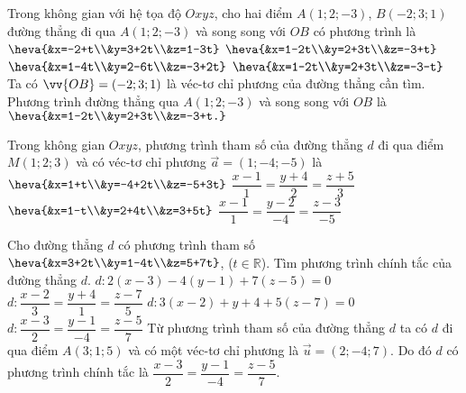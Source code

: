 \begin{ex}%
	Trong không gian với hệ tọa độ $O x y z$, cho hai điểm $A(1;2;-3)$, $B(-2;3;1)$ đường thẳng đi qua $A(1;2;-3)$ và song song với $OB$ có phương trình là 
	\choice 
	{$\heva{&x=-2+t\\&y=3+2t\\&z=1-3t}$}
	{\True $\heva{&x=1-2t\\&y=2+3t\\&z=-3+t}$}
	{$\heva{&x=1-4t\\&y=2-6t\\&z=-3+2t}$}
	{$\heva{&x=1-2t\\&y=2+3t\\&z=-3-t}$}
					\loigiai 
					{
	Ta có $\vv{OB}=(-2;3;1)$ là véc-tơ chỉ phương của đường thẳng cần tìm.\\
	Phương trình đường thẳng qua $A(1;2;-3)$ và song song với $OB$ là $\heva{&x=1-2t\\&y=2+3t\\&z=-3+t.}$
					}
\end{ex}

\begin{ex}%
Trong không gian $O x y z$, phương trình tham số của đường thẳng $d$ đi qua điểm $M(1;2;3)$ và có véc-tơ chỉ phương $\vec{a}=(1;-4;-5)$ là 
\choice 
{$\heva{&x=1+t\\&y=-4+2t\\&z=-5+3t}$}
{$\dfrac{x-1}{1}=\dfrac{y+4}{2}=\dfrac{z+5}{3}$}
{$\heva{&x=1-t\\&y=2+4t\\&z=3+5t}$\True}
{$\dfrac{x-1}{1}=\dfrac{y-2}{-4}=\dfrac{z-3}{-5}$}
\end{ex}

\begin{ex}%
	Cho đường thẳng $d$ có phương trình tham số $\heva{&x=3+2t\\&y=1-4t\\&z=5+7t}$, ($t\in\mathbb{R}$). Tìm phương trình chính tắc của đường thẳng $d$.
		\choice 
		{$d\colon2(x-3)-4(y-1)+7(z-5)=0$}
		{$d\colon\dfrac{x-2}{3}=\dfrac{y+4}{1}=\dfrac{z-7}{5}$}
		{$d\colon3(x-2)+y+4+5(z-7)=0$}
		{$d\colon\dfrac{x-3}{2}=\dfrac{y-1}{-4}=\dfrac{z-5}{7}$\True}
		\loigiai 
		{
Từ phương trình tham số của đường thẳng $d$ ta có $d$ đi qua điểm $A(3;1;5)$ và có một véc-tơ chỉ phương là $\vec{u}=(2;-4;7)$. Do đó $d$ có phương trình chính tắc là $\dfrac{x-3}{2}=\dfrac{y-1}{-4}=\dfrac{z-5}{7}$.
		}
	\end{ex}

